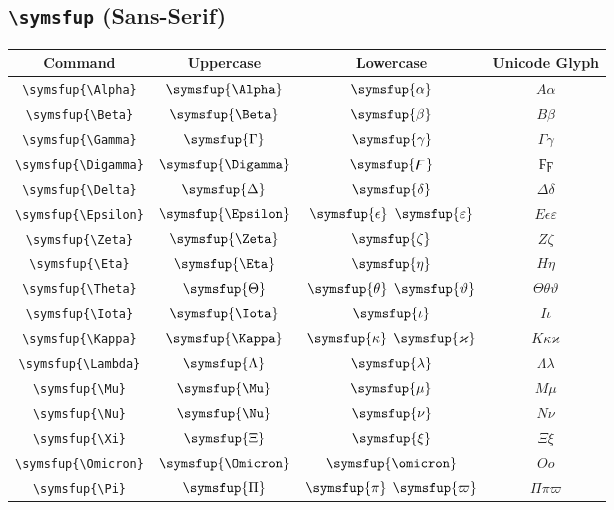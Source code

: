 \documentclass[12pt,a4paper]{article}
\begin{document}
\newpage

\subsection*{\texttt{\textbackslash{}symsfup} (Sans-Serif)}

\begin{longtable}{|c|c|c|c|}
\hline
\textbf{Command} & \textbf{Uppercase} & \textbf{Lowercase} & \textbf{Unicode Glyph} \\
\hline
\verb|\symsfup{\Alpha}| & $\symsfup{\Alpha}$ & $\symsfup{\alpha}$ & $ Α 𝛼 $ \\
\verb|\symsfup{\Beta}| & $\symsfup{\Beta}$ & $\symsfup{\beta}$ & $ Β 𝛽 $ \\
\verb|\symsfup{\Gamma}| & $\symsfup{\Gamma}$ & $\symsfup{\gamma}$ & $ Γ 𝛾 $ \\
\verb|\symsfup{\Digamma}| & $\symsfup{\Digamma}$ & $\symsfup{\digamma}$ & $ Ϝ ϝ $ \\
\verb|\symsfup{\Delta}| & $\symsfup{\Delta}$ & $\symsfup{\delta}$ & $ Δ 𝛿 $ \\
\verb|\symsfup{\Epsilon}| & $\symsfup{\Epsilon}$ & $\symsfup{\epsilon}$ $\symsfup{\varepsilon}$ & $ Ε 𝜖 𝜀 $ \\
\verb|\symsfup{\Zeta}| & $\symsfup{\Zeta}$ & $\symsfup{\zeta}$ & $ Ζ 𝜁 $ \\
\verb|\symsfup{\Eta}| & $\symsfup{\Eta}$ & $\symsfup{\eta}$ & $ Η 𝜂 $ \\
\verb|\symsfup{\Theta}| & $\symsfup{\Theta}$ & $\symsfup{\theta}$ $\symsfup{\vartheta}$ & $ Θ 𝜃 𝜗 $ \\
\verb|\symsfup{\Iota}| & $\symsfup{\Iota}$ & $\symsfup{\iota}$ & $ Ι 𝜄 $ \\
\verb|\symsfup{\Kappa}| & $\symsfup{\Kappa}$ & $\symsfup{\kappa}$ $\symsfup{\varkappa}$ & $ Κ 𝜅 𝜘 $ \\
\verb|\symsfup{\Lambda}| & $\symsfup{\Lambda}$ & $\symsfup{\lambda}$ & $ Λ 𝜆 $ \\
\verb|\symsfup{\Mu}| & $\symsfup{\Mu}$ & $\symsfup{\mu}$ & $ Μ 𝜇 $ \\
\verb|\symsfup{\Nu}| & $\symsfup{\Nu}$ & $\symsfup{\nu}$ & $ Ν 𝜈 $ \\
\verb|\symsfup{\Xi}| & $\symsfup{\Xi}$ & $\symsfup{\xi}$ & $ Ξ 𝜉 $ \\
\verb|\symsfup{\Omicron}| & $\symsfup{\Omicron}$ & $\symsfup{\omicron}$ & $ Ο 𝜊 $ \\
\verb|\symsfup{\Pi}| & $\symsfup{\Pi}$ & $\symsfup{\pi}$ $\symsfup{\varpi}$ & $ Π 𝜋 𝜛 $ \\

\end{longtable}
\end{document}
